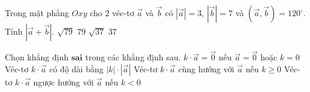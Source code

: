 \begin{ex}%
	Trong mặt phẳng $Oxy$ cho $2$ véc-tơ $\vec a$ và $\vec b$ có $|\vec a|=3$, $|\vec b|=7$ và $(\vec a,\vec b)=120^{\circ}$. Tính $|\vec a+\vec b|$.
	\choice
	{\True $\sqrt{79}$}
	{$79$}
	{$\sqrt{37}$}
	{$37$}
\end{ex}

\begin{ex}%
	Chọn khẳng định $\mathbf{sai}$ trong các khẳng định sau.
	\choice
	{$k\cdot \vec{a}=\overrightarrow{0}$ nếu $\vec{a}=\overrightarrow{0}$ hoặc $k=0$}
	{Véc-tơ $k\cdot \vec{a}$ có độ dài bằng $|k|\cdot|\vec{a}|$}
	{\True Véc-tơ $k\cdot \vec{a}$ cùng hướng với $\vec{a}$ nếu $k \geq 0$}
	{Véc-tơ $k\cdot \vec{a}$ ngược hướng với $\vec{a}$ nếu $k<0$}
\end{ex}

